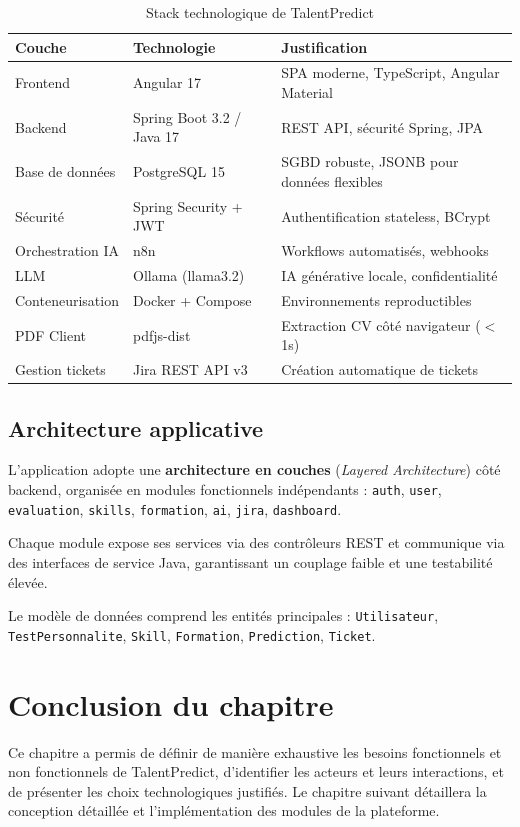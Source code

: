 \documentclass[12pt,a4paper]{report}
\begin{document}
\begin{table}[h]
\centering
\renewcommand{\arraystretch}{1.3}
\begin{tabularx}{\textwidth}{|l|l|X|}
\hline
\rowcolor{lightgray}
\textbf{Couche} & \textbf{Technologie} & \textbf{Justification}\\
\hline
Frontend & Angular 17 & SPA moderne, TypeScript, Angular Material\\
\hline
Backend & Spring Boot 3.2 / Java 17 & REST API, sécurité Spring, JPA\\
\hline
Base de données & PostgreSQL 15 & SGBD robuste, JSONB pour données flexibles\\
\hline
Sécurité & Spring Security + JWT & Authentification stateless, BCrypt\\
\hline
Orchestration IA & n8n & Workflows automatisés, webhooks\\
\hline
LLM & Ollama (llama3.2) & IA générative locale, confidentialité\\
\hline
Conteneurisation & Docker + Compose & Environnements reproductibles\\
\hline
PDF Client & pdfjs-dist & Extraction CV côté navigateur ($<$1s)\\
\hline
Gestion tickets & Jira REST API v3 & Création automatique de tickets\\
\hline
\end{tabularx}
\caption{Stack technologique de TalentPredict}
\label{tab:stack}
\end{table}

\subsection{Architecture applicative}

L'application adopte une \textbf{architecture en couches} (\textit{Layered Architecture}) côté
backend, organisée en modules fonctionnels indépendants :
\texttt{auth}, \texttt{user}, \texttt{evaluation}, \texttt{skills}, \texttt{formation},
\texttt{ai}, \texttt{jira}, \texttt{dashboard}.

Chaque module expose ses services via des contrôleurs REST et communique via des interfaces de
service Java, garantissant un couplage faible et une testabilité élevée.

Le modèle de données comprend les entités principales :
\texttt{Utilisateur}, \texttt{TestPersonnalite}, \texttt{Skill}, \texttt{Formation},
\texttt{Prediction}, \texttt{Ticket}.

\section{Conclusion du chapitre}

Ce chapitre a permis de définir de manière exhaustive les besoins fonctionnels et non fonctionnels
de TalentPredict, d'identifier les acteurs et leurs interactions, et de présenter les choix
technologiques justifiés. Le chapitre suivant détaillera la conception détaillée et
l'implémentation des modules de la plateforme.
\end{document}
